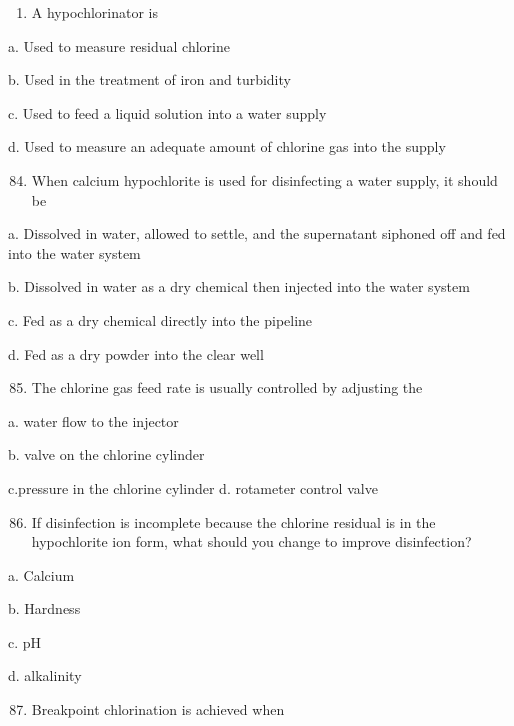 \documentclass[10pt]{article}
\begin{document}
\begin{enumerate}
\begin{enumerate}
\begin{enumerate}
  \item A hypochlorinator is

\end{enumerate}

a. Used to measure residual chlorine

b. Used in the treatment of iron and turbidity

c. Used to feed a liquid solution into a water supply

d. Used to measure an adequate amount of chlorine gas into the supply

\begin{enumerate}
  \setcounter{enumi}{83}
  \item When calcium hypochlorite is used for disinfecting a water supply, it should be
\end{enumerate}

a. Dissolved in water, allowed to settle, and the supernatant siphoned off and fed into the water system

b. Dissolved in water as a dry chemical then injected into the water system

c. Fed as a dry chemical directly into the pipeline

d. Fed as a dry powder into the clear well

\begin{enumerate}
  \setcounter{enumi}{84}
  \item The chlorine gas feed rate is usually controlled by adjusting the
\end{enumerate}

a. water flow to the injector

b. valve on the chlorine cylinder

c.pressure in the chlorine cylinder d. rotameter control valve

\begin{enumerate}
  \setcounter{enumi}{85}
  \item If disinfection is incomplete because the chlorine residual is in the hypochlorite ion form, what should you change to improve disinfection?
\end{enumerate}

a. Calcium

b. Hardness

c. $\mathrm{pH}$

d. alkalinity

\begin{enumerate}
  \setcounter{enumi}{86}
  \item Breakpoint chlorination is achieved when
\end{enumerate}


\end{enumerate}
\end{enumerate}
\end{document}
